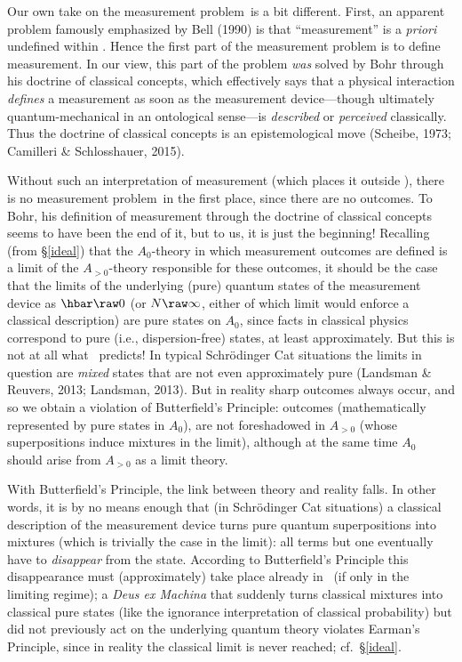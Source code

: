 \documentclass[12pt]{article}
\newcommand{\mmp}{measurement problem}
\begin{document}
Our own take on the \mmp\ is a bit different. First, an apparent problem famously emphasized by Bell (1990) is that ``measurement''  is a \emph{priori} undefined within \qm.  Hence the first part of the measurement problem is to define measurement. In our view, this part of the problem \emph{was} solved by Bohr through his doctrine of classical concepts, which effectively says that a physical interaction \emph{defines} a measurement as soon as the  measurement device---though ultimately quantum-mechanical in an ontological sense---is \emph{described} or \emph{perceived} classically. Thus the doctrine of classical concepts is an epistemological  move (Scheibe, 1973; Camilleri \& Schlosshauer, 2015). 

Without such an interpretation of measurement (which places it outside \qm), there is no \mmp\ in the first place, since there are no outcomes.  
To Bohr, his definition of measurement through the doctrine of classical concepts seems to have been the end of it, but to us, it is just the beginning!  Recalling (from \S\ref{ideal}) that the $A_0$-theory in which measurement outcomes are defined is a limit of the $A_{>0}$-theory responsible for these outcomes, it should be the case that the limits of the underlying (pure) quantum states of the measurement device as $\hbar\raw 0$ (or $N\raw\infty$, either of which limit would enforce a classical description) are pure states on $A_0$, since facts in classical physics correspond to pure (i.e., dispersion-free) states, at least approximately. But this is not at all what \qm\ predicts!  In typical Schr\"{o}dinger Cat situations the limits in question are \emph{mixed} states that are not even approximately pure (Landsman \& Reuvers, 2013; Landsman, 2013). But in reality  sharp outcomes always occur, and so we obtain a violation of  Butterfield's Principle: outcomes (mathematically represented by pure states in $A_0$), are not foreshadowed in $A_{>0}$ (whose superpositions induce mixtures in the limit), although at the same time $A_0$  should arise from $A_{>0}$ as a limit theory. 

With Butterfield's Principle, the link between theory and reality falls. In other words, it is by no means enough that (in Schr\"{o}dinger Cat situations) a classical description of the measurement device turns pure quantum superpositions into mixtures (which is trivially the case in the limit): 
 all terms but one eventually have to \emph{disappear} from the state. According to Butterfield's Principle
this disappearance must (approximately) take place already in \qm\ (if only in the limiting regime); a \emph{Deus ex Machina} that suddenly turns classical mixtures into classical pure states (like the ignorance interpretation of classical probability) but did not previously act on the underlying quantum theory  violates   Earman's Principle, since in reality the classical limit is never reached; cf.\ \S\ref{ideal}. 
\end{document}
